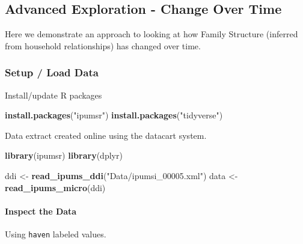 \documentclass[
]{book}
\newenvironment{Shaded}{\begin{snugshade}}{\end{snugshade}}
\newcommand{\DecValTok}[1]{\textcolor[rgb]{0.00,0.00,0.81}{#1}}
\newcommand{\FunctionTok}[1]{\textcolor[rgb]{0.13,0.29,0.53}{\textbf{#1}}}
\newcommand{\NormalTok}[1]{#1}
\newcommand{\OtherTok}[1]{\textcolor[rgb]{0.56,0.35,0.01}{#1}}
\newcommand{\SpecialCharTok}[1]{\textcolor[rgb]{0.81,0.36,0.00}{\textbf{#1}}}
\newcommand{\StringTok}[1]{\textcolor[rgb]{0.31,0.60,0.02}{#1}}
\begin{document}
\hypertarget{advanced-exploration---change-over-time}{%
\subsection*{Advanced Exploration - Change Over Time}\label{advanced-exploration---change-over-time}}

Here we demonstrate an approach to looking at how Family Structure (inferred from household relationships) has changed over time.

\hypertarget{setup-load-data}{%
\subsubsection*{Setup / Load Data}\label{setup-load-data}}

Install/update R packages

\begin{Shaded}
\begin{Highlighting}[]
\FunctionTok{install.packages}\NormalTok{(}\StringTok{"ipumsr"}\NormalTok{)}
\FunctionTok{install.packages}\NormalTok{(}\StringTok{"tidyverse"}\NormalTok{)}
\end{Highlighting}
\end{Shaded}

Data extract created online using the datacart system.

\begin{Shaded}
\begin{Highlighting}[]
\FunctionTok{library}\NormalTok{(ipumsr)}
\FunctionTok{library}\NormalTok{(dplyr)}


\NormalTok{ddi }\OtherTok{\textless{}{-}} \FunctionTok{read\_ipums\_ddi}\NormalTok{(}\StringTok{"Data/ipumsi\_00005.xml"}\NormalTok{)}
\NormalTok{data }\OtherTok{\textless{}{-}} \FunctionTok{read\_ipums\_micro}\NormalTok{(ddi)}
\end{Highlighting}
\end{Shaded}

\hypertarget{inspect-the-data}{%
\paragraph*{Inspect the Data}\label{inspect-the-data}}

Using \texttt{haven} labeled values.

\begin{Shaded}
\end{Shaded}
\end{document}
